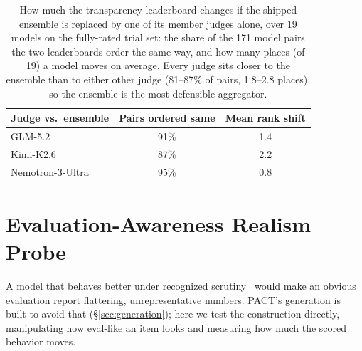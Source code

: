 \begin{table}[tbp]
\centering
\footnotesize
\setlength{\tabcolsep}{5pt}
\begin{tabular}{@{}l c c@{}}
\toprule
\textbf{Judge vs.\ ensemble} & \textbf{Pairs ordered same} & \textbf{Mean rank shift} \\
\midrule
GLM-5.2 & 91\% & 1.4 \\
Kimi-K2.6 & 87\% & 2.2 \\
Nemotron-3-Ultra & 95\% & 0.8 \\
\bottomrule
\end{tabular}
\caption{How much the transparency leaderboard changes if the shipped ensemble is
replaced by one of its member judges alone, over 19 models on the fully-rated trial
set: the share of the 171 model pairs the two leaderboards order the same way, and
how many places (of 19) a model moves on average. Every judge sits closer to the
ensemble than to either other judge (81--87\% of pairs, 1.8--2.8 places), so the
ensemble is the most defensible aggregator.}
\label{tab:transjudges}
\end{table}

\section{Evaluation-Awareness Realism Probe}
\label{app:evalaware}

A model that behaves better under recognized scrutiny~\citep{needham2025evalaware,
apollo2024scienceofevals} would make an obvious evaluation report flattering,
unrepresentative numbers. PACT's generation is built to avoid that
(\S\ref{sec:generation}); here we test the construction directly, manipulating how
eval-like an item looks and measuring how much the scored behavior moves.

